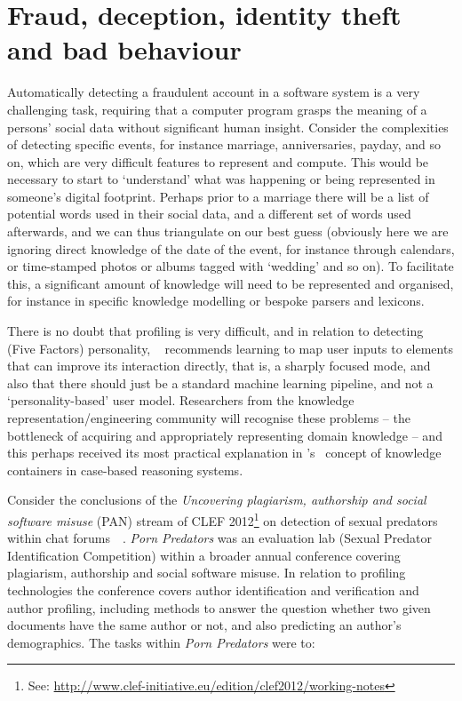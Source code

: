 \documentclass[letterpaper]{article}
\begin{document}
\section{Fraud, deception, identity theft and bad behaviour}

Automatically detecting a fraudulent account in a software system is a
very challenging task, requiring that a computer program grasps the
meaning of a persons' social data without significant human
insight. Consider the complexities of detecting specific events, for
instance marriage, anniversaries, payday, and so on, which are very
difficult features to represent and compute. This would be necessary
to start to `understand' what was happening or being represented in
someone's digital footprint. Perhaps prior to a marriage there will be
a list of potential words used in their social data, and a different
set of words used afterwards, and we can thus triangulate on our best
guess (obviously here we are ignoring direct knowledge of the date of
the event, for instance through calendars, or time-stamped photos or
albums tagged with `wedding' and so on). To facilitate this, a
significant amount of knowledge will need to be represented and
organised, for instance in specific knowledge modelling or bespoke
parsers and lexicons.

There is no doubt that profiling is very difficult, and in relation to
detecting (Five Factors) personality,
\citeauthor{mairesse:2013}~ recommends
learning to map user inputs to elements that can improve its
interaction directly, that is, a sharply focused mode, and also that
there should just be a standard machine learning pipeline, and not a
`personality-based' user model. Researchers from the knowledge
representation/engineering community will recognise these problems --
the bottleneck of acquiring and appropriately representing domain
knowledge -- and this perhaps received its most practical explanation
in \citeauthor{richter:2003}'s~ concept of
knowledge containers in case-based reasoning systems.

Consider the conclusions of the {\emph{Uncovering plagiarism,
authorship and social software misuse}} (PAN) stream of CLEF
2012\footnote{See:
\url{http://www.clef-initiative.eu/edition/clef2012/working-notes}} on
detection of sexual predators within chat
forums~~\cite{inches+crestani:2012}. {\emph{Porn Predators}} was an
evaluation lab (Sexual Predator Identification Competition) within a
broader annual conference covering plagiarism, authorship and social
software misuse. In relation to profiling technologies the conference
covers author identification and verification and author profiling,
including methods to answer the question whether two given documents
have the same author or not, and also predicting an author's
demographics. The tasks within {\emph{Porn Predators}} were to:
\end{document}
